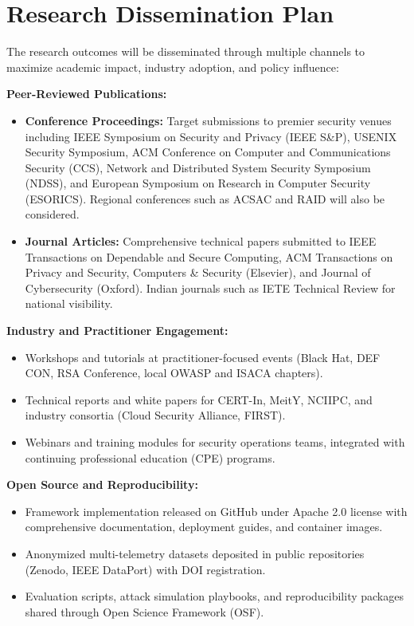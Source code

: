\section{Research Dissemination Plan}\label{sec:intro-dissemination}
The research outcomes will be disseminated through multiple channels to maximize academic impact, industry adoption, and policy influence:

\textbf{Peer-Reviewed Publications:}
\begin{itemize}
    \item \textbf{Conference Proceedings:} Target submissions to premier security venues including IEEE Symposium on Security and Privacy (IEEE S\&P), USENIX Security Symposium, ACM Conference on Computer and Communications Security (CCS), Network and Distributed System Security Symposium (NDSS), and European Symposium on Research in Computer Security (ESORICS). Regional conferences such as ACSAC and RAID will also be considered.
    \item \textbf{Journal Articles:} Comprehensive technical papers submitted to IEEE Transactions on Dependable and Secure Computing, ACM Transactions on Privacy and Security, Computers \& Security (Elsevier), and Journal of Cybersecurity (Oxford). Indian journals such as IETE Technical Review for national visibility.
\end{itemize}

\textbf{Industry and Practitioner Engagement:}
\begin{itemize}
    \item Workshops and tutorials at practitioner-focused events (Black Hat, DEF CON, RSA Conference, local OWASP and ISACA chapters).
    \item Technical reports and white papers for CERT-In, MeitY, NCIIPC, and industry consortia (Cloud Security Alliance, FIRST).
    \item Webinars and training modules for security operations teams, integrated with continuing professional education (CPE) programs.
\end{itemize}

\textbf{Open Source and Reproducibility:}
\begin{itemize}
    \item Framework implementation released on GitHub under Apache 2.0 license with comprehensive documentation, deployment guides, and container images.
    \item Anonymized multi-telemetry datasets deposited in public repositories (Zenodo, IEEE DataPort) with DOI registration.
    \item Evaluation scripts, attack simulation playbooks, and reproducibility packages shared through Open Science Framework (OSF).
\end{itemize}

